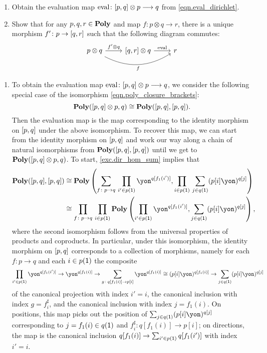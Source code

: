 \documentclass[Book-Poly]{subfiles}
\begin{document}
\begin{exercise} \label{exc.eval_dirichlet}
\begin{enumerate}
	\item Obtain the evaluation map $\mathrm{eval}\colon [p,q]\otimes p\longrightarrow q$ from \eqref{eqn.eval_dirichlet}. \label{exc.eval_dirichlet.explicit}
	\item Show that for any $p,q,r \in \mathbf{Poly}$ and map $f\colon p\otimes q\to r$, there is a unique morphism $f'\colon p\to[q,r]$ such that the following diagram commutes:
	\[
	\begin{tikzcd}
		p\otimes q\ar[r, "f'\otimes q"]\ar[rr, bend right, "f"']&
		{\ihom{q,r}}\otimes q\ar[r, "\fun{eval}"]&
		r
	\end{tikzcd}
	\]
	\qedhere
\end{enumerate}
\begin{solution}
\begin{enumerate}
    \item To obtain the evaluation map $\mathrm{eval}\colon [p,q]\otimes p\longrightarrow q$, we consider the following special case of the isomorphism \eqref{eqn.poly_closure_brackets}:
    \[
        \mathbf{Poly}([p,q] \otimes p, q) \cong \mathbf{Poly}([p,q], [p,q]).
    \]
    Then the evaluation map is the map corresponding to the identity morphism on $[p,q]$ under the above isomorphism.
    To recover this map, we can start from the identity morphism on $[p,q]$ and work our way along a chain of natural isomorphisms from $\mathbf{Poly}([p,q], [p,q])$ until we get to $\mathbf{Poly}([p,q] \otimes p, q)$.
    To start, \cref{exc.dir_hom_sum} implies that
    \begin{align*}
        \poly(\ihom{p,q}, \ihom{p,q})
        &\iso
        \poly\left(\sum_{f \colon p \to q} \, \prod_{i' \in p(\1)} \yon^{q[f_1(i')]}, \prod_{i \in p(\1)} \, \sum_{j \in q(\1)} (p[i]\yon)^{q[j]}\right) \\
        &\iso
        \prod_{f \colon p \to q} \, \prod_{i \in p(\1)} \poly\left(\prod_{i' \in p(\1)} \yon^{q[f_1(i')]}, \sum_{j \in q(\1)} (p[i]\yon)^{q[j]}\right),
    \end{align*}
    where the second isomorphism follows from the universal properties of products and coproducts.
    In particular, under this isomorphism, the identity morphism on $[p,q]$ corresponds to a collection of morphisms, namely for each $f \colon p \to q$ and each $i \in p(\textsf{1})$ the composite
    \[
        \prod_{i' \in p(\1)} \yon^{q[f_1(i')]} \to \yon^{q[f_1(i)]} \to \sum_{g \colon q[f_1(i)] \to p[i]} \yon^{q[f_1(i)]} \iso (p[i]\yon)^{q[f_1(i)]} \to \sum_{j \in q(\1)} (p[i]\yon)^{q[j]}
    \]
    of the canonical projection with index $i' = i$, the canonical inclusion with index $g = f^\sharp_i$, and the canonical inclusion with index $j = f_1(i)$.
    On positions, this map picks out the position of $\sum_{j \in q(\1)} (p[i]\yon)^{q[j]}$ corresponding to $j = f_1(i) \in q(\textsf{1})$ and $f^\sharp_i \colon q[f_1(i)] \to p[i]$; on directions, the map is the canonical inclusion $q[f_1(i)] \to \sum_{i' \in p(\textsf{1})} q[f_1(i')]$ with index $i' = i$.
    

\end{enumerate}
\end{solution}
\end{exercise}
\end{document}
